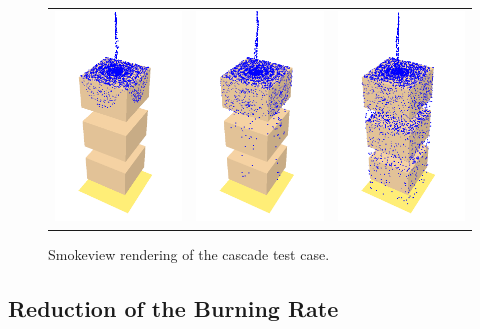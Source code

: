 \documentclass[11pt]{book}
\begin{document}
\begin{figure}[ht]
\begin{center}
\begin{tabular}{lcr}
\includegraphics[height=2.2in]{SCRIPT_FIGURES/cascade_1} &
\includegraphics[height=2.2in]{SCRIPT_FIGURES/cascade_2} &
\includegraphics[height=2.2in]{SCRIPT_FIGURES/cascade_3}
\end{tabular}
\end{center}
\caption[Example of water cascading over solid obstructions]{Smokeview rendering of the {\ct cascade} test case.}
\label{cascade}
\end{figure}




\subsection{Reduction of the Burning Rate}
\end{document}
